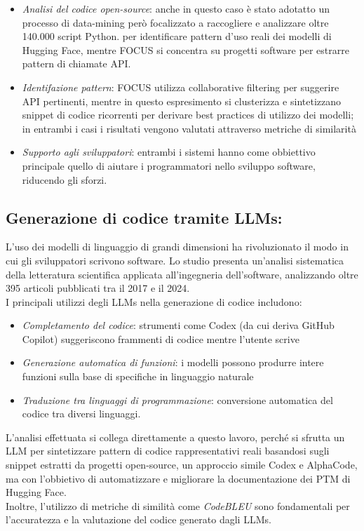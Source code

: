 \documentclass{article}
\begin{document}
\begin{itemize}
    \item \textit{Analisi del codice open-source}: anche in questo caso è stato adotatto un processo di data-mining però focalizzato a raccogliere e analizzare oltre 140.000 script Python. per identificare pattern d’uso reali dei modelli di Hugging Face, mentre FOCUS si concentra su progetti software per estrarre pattern di chiamate API.
    \item \textit{Identifazione pattern}: FOCUS utilizza collaborative filtering per suggerire API pertinenti, mentre in questo espresimento si clusterizza e sintetizzano snippet di codice ricorrenti per derivare best practices di utilizzo dei modelli; in entrambi i casi i risultati vengono valutati attraverso metriche di similarità
    \item \textit{Supporto agli sviluppatori}: entrambi i sistemi hanno come obbiettivo principale quello di aiutare i programmatori nello sviluppo software, riducendo gli sforzi.
\end{itemize}

\subsection{Generazione di codice tramite LLMs:}
L’uso dei modelli di linguaggio di grandi dimensioni ha rivoluzionato il modo in cui gli sviluppatori scrivono software. Lo studio\cite{hou2024large} presenta un'analisi sistematica della letteratura scientifica applicata all'ingegneria dell'software, analizzando oltre 395 articoli pubblicati tra il 2017 e il 2024.\\
I principali utilizzi degli LLMs nella generazione di codice includono:
\begin{itemize}
    \item \textit{Completamento del codice}: strumenti come Codex (da cui deriva GitHub Copilot) suggeriscono frammenti di codice mentre l’utente scrive
    \item \textit{Generazione automatica di funzioni}: i modelli possono produrre intere funzioni sulla base di specifiche in linguaggio naturale
    \item \textit{Traduzione tra linguaggi di programmazione}: conversione automatica del codice tra diversi linguaggi.
\end{itemize}
L'analisi effettuata si collega direttamente a questo lavoro, perché si sfrutta un LLM per sintetizzare pattern di codice rappresentativi reali basandosi sugli snippet estratti da progetti open-source, un approccio simile Codex e AlphaCode, ma con l'obbietivo di automatizzare e migliorare la documentazione dei PTM di Hugging Face.\\
Inoltre, l'utilizzo di metriche di similità come \textit{CodeBLEU} sono fondamentali per l'accuratezza e la valutazione del codice generato dagli LLMs.
\end{document}
